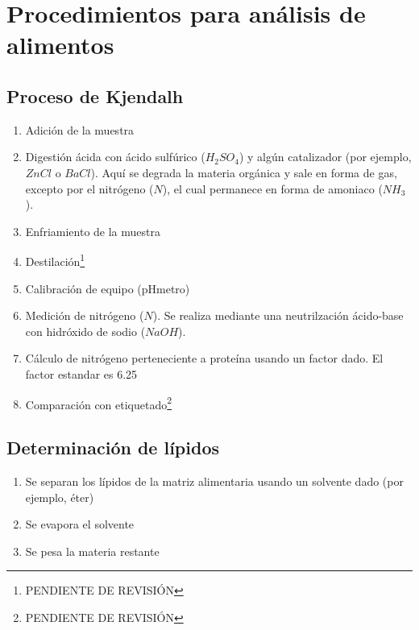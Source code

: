 \section{Procedimientos para análisis de alimentos}

\subsection{Proceso de Kjendalh}

\begin{enumerate}
    \item Adición de la muestra
    \item Digestión ácida con ácido sulfúrico ($H_{2}SO_{4}$) y algún catalizador (por ejemplo, $ZnCl$ o $BaCl$). Aquí se degrada la materia orgánica y sale en forma de gas, excepto por el nitrógeno ($N$), el cual permanece en forma de amoniaco ($NH_{3}$).
    \item Enfriamiento de la muestra
    \item Destilación\footnote{PENDIENTE DE REVISIÓN}
    \item Calibración de equipo (pHmetro)
    \item Medición de nitrógeno ($N$). Se realiza mediante una neutrilzación ácido-base con hidróxido de sodio ($NaOH$).
    \item Cálculo de nitrógeno perteneciente a proteína usando un factor dado. El factor estandar es 6.25
    \item Comparación con etiquetado\footnote{PENDIENTE DE REVISIÓN}
\end{enumerate}

\subsection{Determinación de lípidos}

\begin{enumerate}
    \item Se separan los lípidos de la matriz alimentaria usando un solvente dado (por ejemplo, éter)
    \item Se evapora el solvente
    \item Se pesa la materia restante
\end{enumerate}